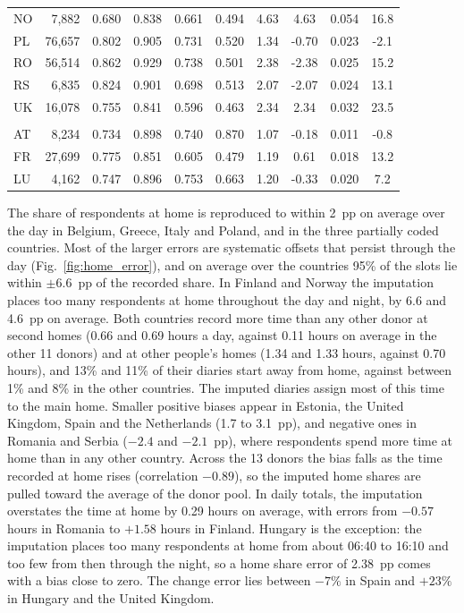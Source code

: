 \documentclass[a4paper]{article}
\begin{document}
\begin{table}[ht]
\begin{tabular}{l r S[table-format=1.3] S[table-format=1.3] S[table-format=1.3] S[table-format=1.3] S[table-format=1.2] S[table-format=-1.2] S[table-format=1.3] S[table-format=-2.1]}
\quad NO & 7{,}882 & 0.680 & 0.838 & 0.661 & 0.494 & 4.63 & 4.63 & 0.054 & 16.8 \\
\quad PL & 76{,}657 & 0.802 & 0.905 & 0.731 & 0.520 & 1.34 & -0.70 & 0.023 & -2.1 \\
\quad RO & 56{,}514 & 0.862 & 0.929 & 0.738 & 0.501 & 2.38 & -2.38 & 0.025 & 15.2 \\
\quad RS & 6{,}835 & 0.824 & 0.901 & 0.698 & 0.513 & 2.07 & -2.07 & 0.024 & 13.1 \\
\quad UK & 16{,}078 & 0.755 & 0.841 & 0.596 & 0.463 & 2.34 & 2.34 & 0.032 & 23.5 \\
\addlinespace
{} \\
\quad AT & 8{,}234 & 0.734 & 0.898 & 0.740 & 0.870 & 1.07 & -0.18 & 0.011 & -0.8 \\
\quad FR & 27{,}699 & 0.775 & 0.851 & 0.605 & 0.479 & 1.19 & 0.61 & 0.018 & 13.2 \\
\quad LU & 4{,}162 & 0.747 & 0.896 & 0.753 & 0.663 & 1.20 & -0.33 & 0.020 & 7.2 \\
\bottomrule
\end{tabular}
\end{table}

The share of respondents at home is reproduced to within 2~pp on average over the day in Belgium, Greece, Italy and Poland, and in the three partially coded countries. Most of the larger errors are systematic offsets that persist through the day (Fig.~\ref{fig:home_error}), and on average over the countries 95\% of the slots lie within $\pm 6.6$~pp of the recorded share. In Finland and Norway the imputation places too many respondents at home throughout the day and night, by 6.6 and 4.6~pp on average. Both countries record more time than any other donor at second homes (0.66 and 0.69 hours a day, against 0.11 hours on average in the other 11 donors) and at other people's homes (1.34 and 1.33 hours, against 0.70 hours), and 13\% and 11\% of their diaries start away from home, against between 1\% and 8\% in the other countries. The imputed diaries assign most of this time to the main home. Smaller positive biases appear in Estonia, the United Kingdom, Spain and the Netherlands (1.7 to 3.1~pp), and negative ones in Romania and Serbia ($-2.4$ and $-2.1$~pp), where respondents spend more time at home than in any other country. Across the 13 donors the bias falls as the time recorded at home rises (correlation $-0.89$), so the imputed home shares are pulled toward the average of the donor pool. In daily totals, the imputation overstates the time at home by 0.29 hours on average, with errors from $-0.57$ hours in Romania to $+1.58$ hours in Finland. Hungary is the exception: the imputation places too many respondents at home from about 06:40 to 16:10 and too few from then through the night, so a home share error of 2.38~pp comes with a bias close to zero. The change error lies between $-7\%$ in Spain and $+23\%$ in Hungary and the United Kingdom.
\end{document}
